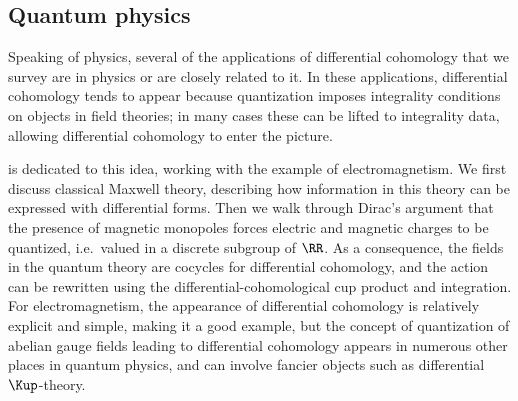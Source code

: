 \subsection*{Quantum physics}
Speaking of physics, several of the applications of differential cohomology that we survey are in physics or are
closely related to it. In these applications, differential cohomology tends to appear because quantization imposes
integrality conditions on objects in field theories; in many cases these can be lifted to integrality data,
allowing differential cohomology to enter the picture.

 is dedicated to this idea, working with the example of electromagnetism. We first discuss
classical Maxwell theory, describing how information in this theory can be expressed with differential forms. Then
we walk through Dirac's argument \cite{Dir31} that the presence of magnetic monopoles forces electric and magnetic
charges to be quantized, i.e.\ valued in a discrete subgroup of $\RR$. As a consequence, the fields in the quantum
theory are cocycles for differential cohomology, and the action can be rewritten using the
differential-cohomological cup product and integration. For electromagnetism, the appearance of differential
cohomology is relatively explicit and simple, making it a good example, but the concept of quantization of abelian
gauge fields leading to differential cohomology appears in numerous other places in quantum physics, and can
involve fancier objects such as differential $\Kup$-theory.

